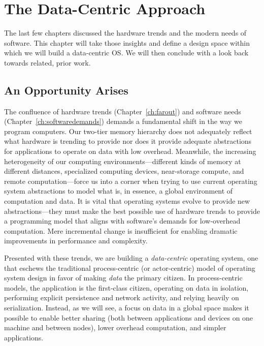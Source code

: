 
\chapter{The Data-Centric Approach}\label{ch:datacentric}


\begin{chabstract}
    The last few chapters discussed the hardware trends and the modern needs of software. This chapter will take those
    insights and define a design space within which we will build a data-centric OS. We will then conclude with a look
    back towards related, prior work.
\end{chabstract}

\section{An Opportunity Arises}


The confluence of hardware trends (Chapter~\ref{ch:farout}) and software needs (Chapter~\ref{ch:softwaredemands})
demands a fundamental shift in the way we program computers. Our two-tier memory hierarchy does not adequately reflect
what hardware is trending to provide nor does it provide adequate abstractions for applications to operate on data with
low overhead. Meanwhile, the increasing heterogeneity of our computing environments---different kinds of memory
at different distances, specialized computing devices, near-storage compute, and remote computation---force us into a
corner when trying to use current operating system abstractions to model what is, in essence, a global environment of computation and
data. It is vital that operating systems evolve to provide new abstractions---they must make the
best possible use of hardware trends to provide a programming model that aligns with software's demands for low-overhead
computation. Mere incremental change is insufficient for enabling dramatic improvements in performance and complexity.

Presented with these trends, we are building a \emph{data-centric} operating system, one that eschews the traditional
process-centric (or actor-centric) model of operating system design in favor of making \emph{data} the primary citizen.
In process-centric models, the application is the first-class citizen, operating on data in isolation, performing
explicit persistence and network activity, and relying heavily on serialization. Instead, as we will see, a focus on data in a global
space makes it possible to enable better sharing (both between applications and devices on one machine and between
nodes), lower overhead computation, and simpler applications.

